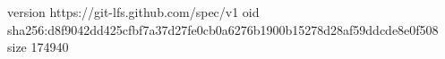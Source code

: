 version https://git-lfs.github.com/spec/v1
oid sha256:d8f9042dd425cfbf7a37d27fe0cb0a6276b1900b15278d28af59ddcde8e0f508
size 174940
